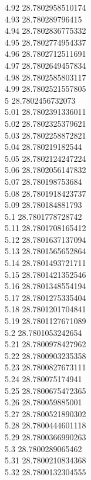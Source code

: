 {4.92	28.7802958510174\\
4.93	28.780289796415\\
4.94	28.7802836775332\\
4.95	28.7802774954337\\
4.96	28.7802712511691\\
4.97	28.7802649457834\\
4.98	28.7802585803117\\
4.99	28.7802521557805\\
5	28.7802456732073\\
5.01	28.7802391336011\\
5.02	28.7802325379621\\
5.03	28.7802258872821\\
5.04	28.780219182544\\
5.05	28.7802124247224\\
5.06	28.7802056147832\\
5.07	28.780198753684\\
5.08	28.7801918423737\\
5.09	28.780184881793\\
5.1	28.7801778728742\\
5.11	28.7801708165412\\
5.12	28.7801637137094\\
5.13	28.7801565652864\\
5.14	28.7801493721711\\
5.15	28.7801421352546\\
5.16	28.7801348554194\\
5.17	28.7801275335404\\
5.18	28.7801201704841\\
5.19	28.7801127671089\\
5.2	28.7801053242654\\
5.21	28.7800978427962\\
5.22	28.7800903235358\\
5.23	28.7800827673111\\
5.24	28.780075174941\\
5.25	28.7800675472365\\
5.26	28.780059885001\\
5.27	28.7800521890302\\
5.28	28.7800444601118\\
5.29	28.7800366990263\\
5.3	28.7800289065462\\
5.31	28.7800210834368\\
5.32	28.7800132304555\\
}
